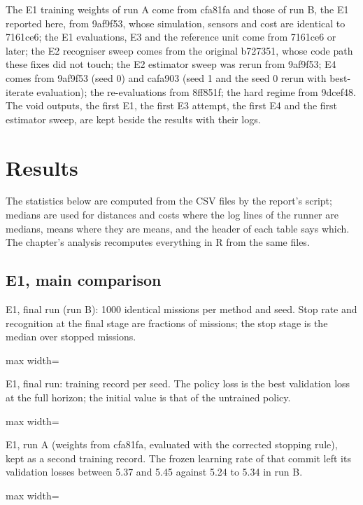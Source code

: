 \documentclass[11pt,a4paper]{article}
\newcommand{\tabfit}[1]{\begin{adjustbox}{max width=\textwidth}\small #1\end{adjustbox}}
\begin{document}
The E1 training weights of run A come from cfa81fa and those of run B, the E1 reported here, from 9af9f53, whose simulation, sensors and cost are identical to 7161ce6; the E1 evaluations, E3 and the reference unit come from 7161ce6 or later; the E2 recogniser sweep comes from the original b727351, whose code path these fixes did not touch; the E2 estimator sweep was rerun from 9af9f53; E4 comes from 9af9f53 (seed 0) and cafa903 (seed 1 and the seed 0 rerun with best-iterate evaluation); the re-evaluations from 8ff851f; the hard regime from 9dcef48. The void outputs, the first E1, the first E3 attempt, the first E4 and the first estimator sweep, are kept beside the results with their logs.

\section{Results}

The statistics below are computed from the CSV files by the report's script; medians are used for distances and costs where the log lines of the runner are medians, means where they are means, and the header of each table says which. The chapter's analysis recomputes everything in R from the same files.

\subsection{E1, main comparison}

\begin{table}[H]\caption{E1, final run (run B): 1000 identical missions per method and seed. Stop rate and recognition at the final stage are fractions of missions; the stop stage is the median over stopped missions.}
\tabfit{}\end{table}

\begin{table}[H]\caption{E1, final run: training record per seed. The policy loss is the best validation loss at the full horizon; the initial value is that of the untrained policy.}
\tabfit{}\end{table}

\begin{table}[H]\caption{E1, run A (weights from cfa81fa, evaluated with the corrected stopping rule), kept as a second training record. The frozen learning rate of that commit left its validation losses between 5.37 and 5.45 against 5.24 to 5.34 in run B.}
\tabfit{}\end{table}
\end{document}
